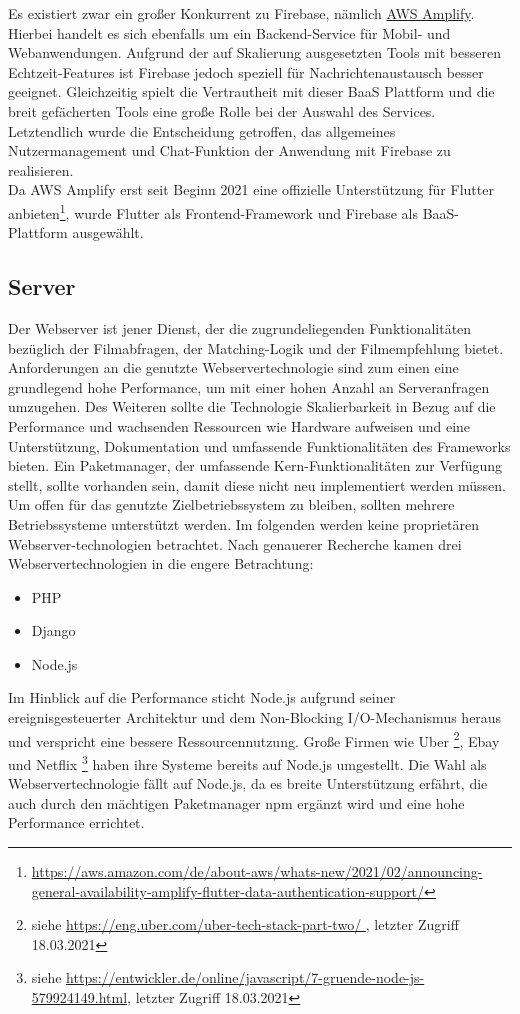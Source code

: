 Es existiert zwar ein großer Konkurrent zu Firebase, nämlich \href{https://docs.amplify.aws/}{AWS Amplify}.
Hierbei handelt es sich ebenfalls um ein Backend-Service für Mobil- und Webanwendungen. 
Aufgrund der auf Skalierung ausgesetzten Tools mit besseren Echtzeit-Features ist Firebase jedoch speziell für Nachrichtenaustausch besser geeignet.
Gleichzeitig spielt die Vertrautheit mit dieser BaaS Plattform und die breit gefächerten Tools eine große Rolle bei der Auswahl des Services.
Letztendlich wurde die Entscheidung getroffen, das allgemeines Nutzermanagement und Chat-Funktion der Anwendung mit Firebase zu realisieren.\\
Da AWS Amplify erst seit Beginn 2021 eine offizielle Unterstützung für Flutter anbieten\footnote{\url{https://aws.amazon.com/de/about-aws/whats-new/2021/02/announcing-general-availability-amplify-flutter-data-authentication-support/}}, wurde Flutter als Frontend-Framework und Firebase als BaaS-Plattform ausgewählt.

\subsection{Server}
Der Webserver ist jener Dienst,  der die zugrundeliegenden Funktionalitäten bezüglich der Filmabfragen, der Matching-Logik und der Filmempfehlung bietet. 
Anforderungen an die genutzte Webservertechnologie sind zum einen eine grundlegend hohe Performance, um mit einer hohen Anzahl an Serveranfragen umzugehen. Des Weiteren sollte die Technologie Skalierbarkeit in Bezug auf die Performance und wachsenden Ressourcen wie Hardware aufweisen und eine Unterstützung, Dokumentation und umfassende Funktionalitäten des Frameworks bieten. 
Ein Paketmanager, der umfassende Kern-Funktionalitäten zur Verfügung stellt, sollte vorhanden sein, damit diese nicht neu implementiert werden müssen. Um offen für das genutzte Zielbetriebssystem zu bleiben, sollten mehrere Betriebssysteme unterstützt werden. 
Im folgenden werden keine proprietären Webserver-technologien betrachtet.
\newline
Nach genauerer Recherche kamen drei Webservertechnologien in die engere Betrachtung:

\begin{itemize}
	\item PHP
	\item Django
	\item Node.js
\end{itemize} 

\noindent
Im Hinblick auf die Performance sticht Node.js aufgrund seiner ereignisgesteuerter Architektur  und dem Non-Blocking I/O-Mechanismus heraus und verspricht eine bessere Ressourcennutzung. 
\newline
Große Firmen wie Uber \footnote{siehe \url{https://eng.uber.com/uber-tech-stack-part-two/ }, letzter Zugriff 18.03.2021}, Ebay und Netflix \footnote{siehe \url{https://entwickler.de/online/javascript/7-gruende-node-js-579924149.html}, letzter Zugriff 18.03.2021 } haben ihre Systeme bereits auf Node.js umgestellt. Die Wahl als Webservertechnologie fällt auf Node.js, da es breite Unterstützung erfährt, die auch durch den mächtigen Paketmanager npm ergänzt wird und eine hohe Performance errichtet.


